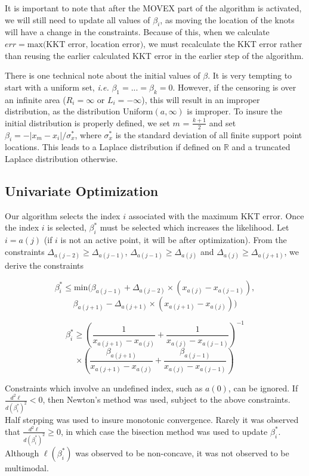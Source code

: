 	It is important to note that after the MOVEX part of the algorithm is activated, we will still need to update all values of $\beta_i$, as moving the location of the knots will have a change in the constraints. Because of this, when we calculate $err = \text{max(KKT error, location error)}$, we must recalculate the KKT error rather than reusing the earlier calculated KKT error in the earlier step of the algorithm. 
	
	There is one technical note about the initial values of $\beta$. It is very tempting to start with a uniform set, \emph{i.e.} $\beta_1 = ... = \beta_k = 0$. However, if the censoring is over an infinite area ($R_i = \infty$ or $L_i = -\infty$), this will result in an improper distribution, as the distribution Uniform$(a, \infty)$ is improper. To insure the initial distribution is properly defined, we set $m$ = $\frac{k + 1} {2}$ and set $\beta_i = -|x_m - x_i | / \sigma_x^*$, where $\sigma_x^*$ is the standard deviation of all finite support point locations. This leads to a Laplace distribution if defined on $\mathbb{R}$ and a truncated Laplace distribution otherwise.	
	{\subsection{Univariate Optimization}} 
	
	Our algorithm selects the index $i$ associated with the maximum KKT error. Once the index $i$ is selected, $\beta_i^*$ must be selected which increases the likelihood. Let $i = a(j)$ (if $i$ is not an active point, it will be after optimization). From the constraints $\Delta_{a(j-2)} \geq \Delta_{a(j-1)}$, $\Delta_{a(j-1)} \geq \Delta_{a(j)}$ and $\Delta_{a(j)} \geq \Delta_{a(j+1)}$, we derive the constraints
	
	\[
	 \beta_i^* \leq \text{min} (\beta_{a(j-1)} + \Delta_{a(j-2)} \times (x_{a(j)} - x_{a(j-1)}),
	 \]
	 \[
	 \beta_{a(j+1)} -\Delta_{a(j+1)} \times (x_{a(j+1)} - x_{a(j)}) ) 
	\]
	
	\[
	 \beta_i^* \geq \left(\frac{1}{x_{a(j+1)} - x_{a(j)}} +  \frac{1}{x_{a(j)} - x_{a(j-1)} } \right)^{-1} 
	\]
	\[
	\times \left(\frac{\beta_{a(j+1)} } { x_{a(j+1)} - x_{a(j)}} + \frac{\beta_{a(j-1)}} {x_{a(j)} - x_{a(j-1)} } \right)
	\]
	
	Constraints which involve an undefined index, such as $a(0)$, can be ignored. If $\frac{d^2 \ell} {d (\beta^*_{i})^2 } < 0$, then Newton's method was used, subject to the above constraints. Half stepping was used to insure monotonic convergence. Rarely it was observed that $\frac{d^2 \ell} {d (\beta^*_{i}) ^2 } \geq 0$, in which case the bisection method was used to update $\beta^*_i$. Although $\ell(\beta^*_i)$ was observed to be non-concave, it was not observed to be multimodal.
	
